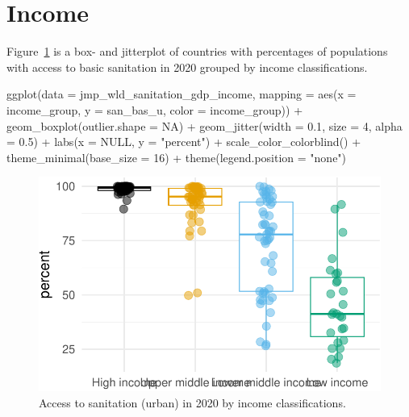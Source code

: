 \documentclass[
  letterpaper,
  DIV=11,
  numbers=noendperiod]{scrartcl}
\newenvironment{Shaded}{\begin{snugshade}}{\end{snugshade}}
\newcommand{\AttributeTok}[1]{\textcolor[rgb]{0.40,0.45,0.13}{#1}}
\newcommand{\ConstantTok}[1]{\textcolor[rgb]{0.56,0.35,0.01}{#1}}
\newcommand{\DecValTok}[1]{\textcolor[rgb]{0.68,0.00,0.00}{#1}}
\newcommand{\FloatTok}[1]{\textcolor[rgb]{0.68,0.00,0.00}{#1}}
\newcommand{\FunctionTok}[1]{\textcolor[rgb]{0.28,0.35,0.67}{#1}}
\newcommand{\NormalTok}[1]{\textcolor[rgb]{0.00,0.23,0.31}{#1}}
\newcommand{\SpecialCharTok}[1]{\textcolor[rgb]{0.37,0.37,0.37}{#1}}
\newcommand{\StringTok}[1]{\textcolor[rgb]{0.13,0.47,0.30}{#1}}
\begin{document}
\hypertarget{income}{%
\section{Income}\label{income}}

Figure~\ref{fig-san-bas-u-income} is a box- and jitterplot of countries
with percentages of populations with access to basic sanitation in 2020
grouped by income classifications.

\begin{Shaded}
\begin{Highlighting}[]
\FunctionTok{ggplot}\NormalTok{(}\AttributeTok{data =}\NormalTok{ jmp\_wld\_sanitation\_gdp\_income,}
       \AttributeTok{mapping =} \FunctionTok{aes}\NormalTok{(}\AttributeTok{x =}\NormalTok{ income\_group, }
                     \AttributeTok{y =}\NormalTok{ san\_bas\_u, }
                     \AttributeTok{color =}\NormalTok{ income\_group)) }\SpecialCharTok{+}
  \FunctionTok{geom\_boxplot}\NormalTok{(}\AttributeTok{outlier.shape =} \ConstantTok{NA}\NormalTok{) }\SpecialCharTok{+}
  \FunctionTok{geom\_jitter}\NormalTok{(}\AttributeTok{width =} \FloatTok{0.1}\NormalTok{, }\AttributeTok{size =} \DecValTok{4}\NormalTok{, }\AttributeTok{alpha =} \FloatTok{0.5}\NormalTok{) }\SpecialCharTok{+}
  \FunctionTok{labs}\NormalTok{(}\AttributeTok{x =} \ConstantTok{NULL}\NormalTok{, }\AttributeTok{y =} \StringTok{"percent"}\NormalTok{) }\SpecialCharTok{+}
  \FunctionTok{scale\_color\_colorblind}\NormalTok{() }\SpecialCharTok{+}
  \FunctionTok{theme\_minimal}\NormalTok{(}\AttributeTok{base\_size =} \DecValTok{16}\NormalTok{) }\SpecialCharTok{+}
  \FunctionTok{theme}\NormalTok{(}\AttributeTok{legend.position =} \StringTok{"none"}\NormalTok{)}
\end{Highlighting}
\end{Shaded}

\begin{figure}[H]

{\centering \includegraphics{index_files/figure-pdf/fig-san-bas-u-income-1.pdf}

}

\caption{\label{fig-san-bas-u-income}Access to sanitation (urban) in
2020 by income classifications.}

\end{figure}
\end{document}
